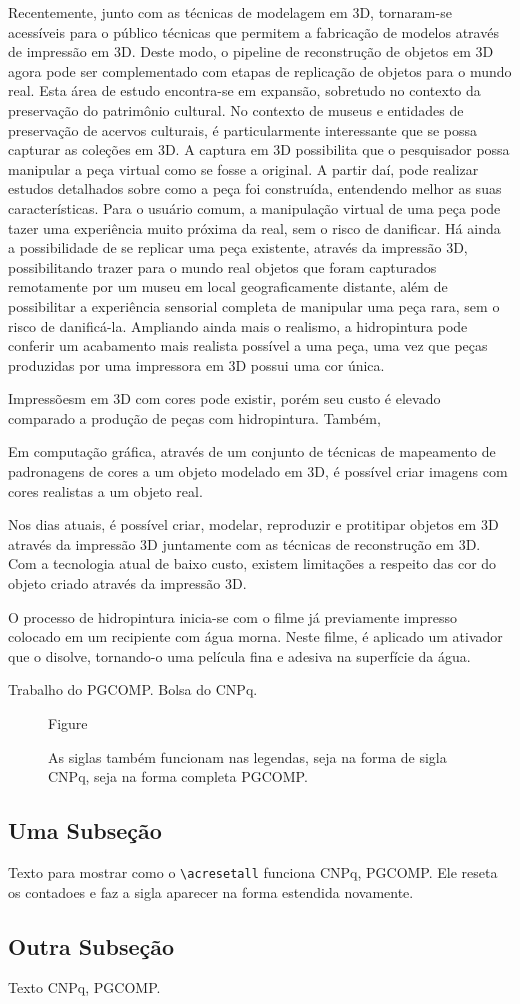 Recentemente, junto com as técnicas de modelagem em 3D, tornaram-se acessíveis para o público técnicas que permitem a fabricação de modelos através de impressão em 3D. Deste modo, o pipeline de reconstrução de objetos em 3D agora pode ser complementado com etapas de replicação de objetos para o mundo real. Esta área de estudo encontra-se em expansão, sobretudo no contexto da preservação do patrimônio cultural. No contexto de museus e entidades de preservação de acervos culturais, é particularmente interessante que se possa capturar as coleções em 3D.
A captura em 3D possibilita que o pesquisador possa manipular a peça virtual como se fosse a original. A partir daí, pode realizar estudos detalhados sobre como a peça foi construída, entendendo melhor as suas características. Para o usuário comum, a manipulação virtual de uma peça pode tazer uma experiência muito próxima da real, sem o risco de danificar. Há ainda a possibilidade de se replicar uma peça existente, através da impressão 3D, possibilitando trazer para o mundo real objetos que foram capturados remotamente por um museu em local geograficamente distante, além de possibilitar a experiência sensorial completa de manipular uma peça rara, sem o risco de danificá-la.
Ampliando ainda mais o realismo, a hidropintura pode conferir um acabamento mais realista possível a uma peça, uma vez que peças produzidas por uma impressora em 3D possui uma cor única.

Impressõesm em 3D com cores pode existir, porém seu custo é elevado comparado a produção de peças com hidropintura. Também,


Em computação gráfica, através de um conjunto de técnicas de mapeamento de padronagens de cores a um objeto modelado em 3D, é possível criar imagens com cores realistas a um objeto real.

Nos dias atuais, é possível criar, modelar, reproduzir e protitipar objetos em 3D através da impressão 3D juntamente com as técnicas de reconstrução em 3D.
Com a tecnologia atual de baixo custo, existem limitações a respeito das cor do objeto criado através da impressão 3D.

O processo de hidropintura inicia-se com o filme já previamente impresso colocado em um recipiente com água morna. Neste filme, é aplicado um ativador que o disolve, tornando-o uma película fina e adesiva na superfície da água.




Trabalho do  \ac{PGCOMP}. Bolsa do \ac{CNPq}.

\begin{figure}[h]
    Figure
    \caption{As siglas também funcionam nas legendas, seja na forma de sigla \ac{CNPq}, seja na forma completa \acf{PGCOMP}.}
\end{figure}


\subsection{Uma Subse\c{c}\~{a}o}
\acresetall
Texto para mostrar como o \verb|\acresetall| funciona \ac{CNPq}, \ac{PGCOMP}. Ele reseta os contadoes e faz a sigla aparecer na forma estendida novamente.

\subsection{Outra Subse\c{c}\~{a}o}

Texto  \acf{CNPq}, \acf{PGCOMP}.

